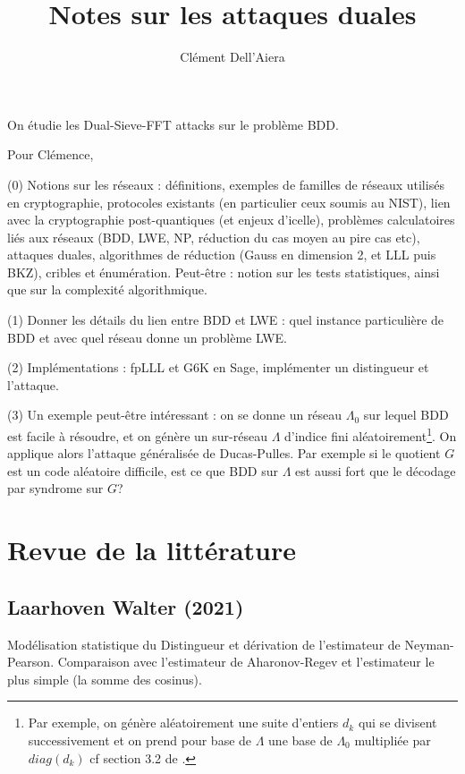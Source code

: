 \documentclass{article}
\title{Notes sur les attaques duales}
\author{Clément Dell'Aiera}
\begin{document}
\maketitle

On étudie les Dual-Sieve-FFT attacks sur le problème BDD.

Pour Clémence,

(0) Notions sur les réseaux : définitions, exemples de familles de réseaux utilisés en cryptographie, protocoles existants (en particulier ceux soumis au NIST), lien avec la cryptographie post-quantiques (et enjeux d'icelle), problèmes calculatoires liés aux réseaux (BDD,  LWE, NP, réduction du cas moyen au pire cas etc), attaques duales, algorithmes de réduction (Gauss en dimension 2, et LLL puis BKZ), cribles et énumération. Peut-être : notion sur les tests statistiques, ainsi que sur la complexité algorithmique.  

(1) Donner les détails du lien entre BDD et LWE : quel instance particulière de BDD et avec quel réseau donne un problème LWE.

(2) Implémentations : fpLLL et G6K en Sage, implémenter un distingueur et l'attaque.

(3) Un exemple peut-être intéressant : on se donne un réseau $\Lambda_0$ sur lequel BDD est facile à résoudre, et on génère un sur-réseau $\Lambda$ d'indice fini aléatoirement\footnote{Par exemple, on génère aléatoirement une suite d'entiers $d_k$ qui se divisent successivement et on prend pour base de $\Lambda$ une base de $\Lambda_0$ multipliée par $diag(d_k)$ cf section 3.2 de \cite{DucasPulles}.}. On applique alors l'attaque généralisée de Ducas-Pulles. Par exemple si le quotient $G$ est un code aléatoire difficile, est ce que BDD sur $\Lambda$ est aussi fort que le décodage par syndrome sur $G$?

\section{Revue de la littérature}

\subsection{Laarhoven Walter (2021)}

Modélisation statistique du Distingueur et dérivation de l'estimateur de Neyman-Pearson. Comparaison avec l'estimateur de Aharonov-Regev et l'estimateur le plus simple (la somme des cosinus). 
\end{document}
